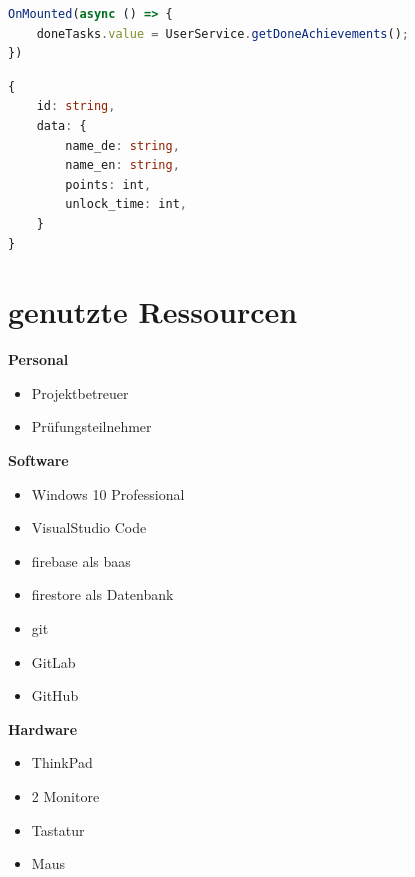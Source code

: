 \documentclass[11pt]{article}
\begin{document}
\begin{lstlisting}[language=TypeScript, caption=OnMounted-Lifecyclehook Beispiel]
OnMounted(async () => {
    doneTasks.value = UserService.getDoneAchievements();
})
\end{lstlisting}

\begin{lstlisting}[language=Typescript, caption=Achievement Datenmodell]
{
    id: string,
    data: {
        name_de: string,
        name_en: string,
        points: int,
        unlock_time: int,
    }
}    
\end{lstlisting}

\clearpage


\appendix

\section{genutzte Ressourcen}
\textbf{Personal}
\begin{itemize}
    \item Projektbetreuer
    \item Prüfungsteilnehmer
\end{itemize}
\textbf{Software}
\begin{itemize}
    \item Windows 10 Professional
    \item VisualStudio Code
    \item \Gls{firebase} als \gls{baas}
    \item \Gls{firestore} als Datenbank
    \item \Gls{git}
    \item GitLab
    \item GitHub
\end{itemize}
\textbf{Hardware}
\begin{itemize}
    \item ThinkPad
    \item 2 Monitore
    \item Tastatur
    \item Maus
\end{itemize}
\newpage
{}




\end{document}

